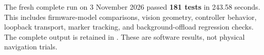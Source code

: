 The fresh complete run on 3 November 2026 passed \textbf{181 tests} in 243.58 seconds. This includes firmware-model comparisons, vision geometry, controller behavior, loopback transport, marker tracking, and background-offload regression checks. The complete output is retained in . These are software results, not physical navigation trials.

